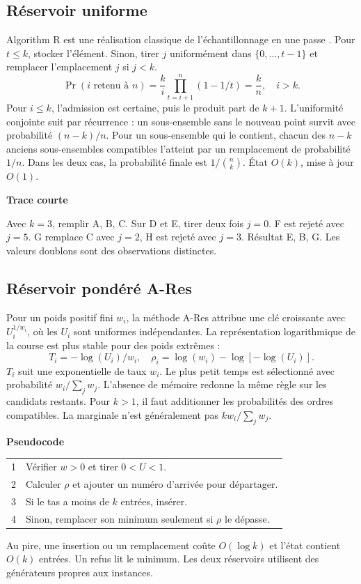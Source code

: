 \documentclass[11pt,a4paper,twocolumn]{article}
\newcommand{\topic}[1]{\textbf{\color{navy}#1}\par}
\newcommand{\columnbreak}{\newpage}
\begin{document}
\subsection{Réservoir uniforme}
Algorithm R est une réalisation classique de l’échantillonnage en une passe \cite{vitter1985}. Pour $t\le k$, stocker l’élément. Sinon, tirer $j$ uniformément dans $\{0,\dots,t-1\}$ et remplacer l’emplacement $j$ si $j<k$.
\begin{equation}
 \Pr(i\text{ retenu à }n)=
 \frac{k}{i}\prod_{t=i+1}^n(1-1/t)=\frac{k}{n},\quad i>k.
\end{equation}
Pour $i\le k$, l’admission est certaine, puis le produit part de $k+1$. L’uniformité conjointe suit par récurrence : un sous-ensemble sans le nouveau point survit avec probabilité $(n-k)/n$. Pour un sous-ensemble qui le contient, chacun des $n-k$ anciens sous-ensembles compatibles l’atteint par un remplacement de probabilité $1/n$. Dans les deux cas, la probabilité finale est $1/\binom nk$. État $O(k)$, mise à jour $O(1)$.

\topic{Trace courte}
Avec $k=3$, remplir A, B, C. Sur D et E, tirer deux fois $j=0$. F est rejeté avec $j=5$. G remplace C avec $j=2$, H est rejeté avec $j=3$. Résultat E, B, G. Les valeurs doublons sont des observations distinctes.
\columnbreak
\subsection{Réservoir pondéré A-Res}
Pour un poids positif fini $w_i$, la méthode A-Res \cite{efraimidis2006} attribue une clé croissante avec $U_i^{1/w_i}$, où les $U_i$ sont uniformes indépendantes. La représentation logarithmique de la course est plus stable pour des poids extrêmes :
\begin{equation}
 T_i=-\log(U_i)/w_i,\quad
 \rho_i=\log(w_i)-\log[-\log(U_i)].
\end{equation}
$T_i$ suit une exponentielle de taux $w_i$. Le plus petit temps est sélectionné avec probabilité $w_i/\sum_j w_j$. L’absence de mémoire redonne la même règle sur les candidats restants. Pour $k>1$, il faut additionner les probabilités des ordres compatibles. La marginale n’est généralement pas $k w_i/\sum_j w_j$.

\topic{Pseudocode}
\begin{tabularx}{\columnwidth}{@{}rX@{}}
1 & Vérifier $w>0$ et tirer $0<U<1$.\\
2 & Calculer $\rho$ et ajouter un numéro d’arrivée pour départager.\\
3 & Si le tas a moins de $k$ entrées, insérer.\\
4 & Sinon, remplacer son minimum seulement si $\rho$ le dépasse.\\
\end{tabularx}
Au pire, une insertion ou un remplacement coûte $O(\log k)$ et l’état contient $O(k)$ entrées. Un refus lit le minimum. Les deux réservoirs utilisent des générateurs propres aux instances.
\end{document}
